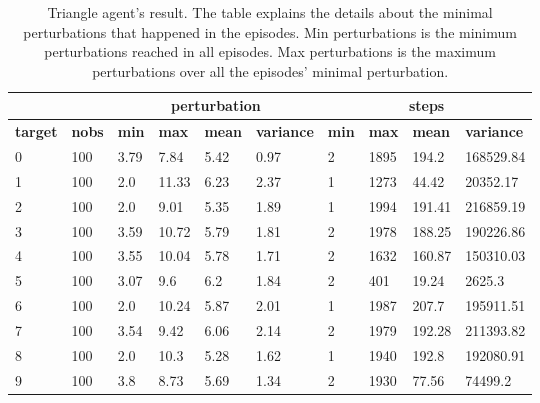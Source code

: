 \documentclass{article}
\begin{document}
\begin{table}[h]
\caption{Triangle agent's result. The table explains the details about the minimal perturbations that happened in the episodes. Min perturbations is the minimum perturbations reached in all episodes. Max perturbations is the maximum perturbations over all the episodes' minimal perturbation.}
\label{tab:simple_result}
\begin{tabular}{|l|l|l|l|l|l|l|l|l|l|}
\hline
\textbf{}       & \textbf{}     & \multicolumn{4}{c|}{\textbf{perturbation}}                      & \multicolumn{4}{c|}{\textbf{steps}}                             \\ \hline
\textbf{target} & \textbf{nobs} & \textbf{min} & \textbf{max} & \textbf{mean} & \textbf{variance} & \textbf{min} & \textbf{max} & \textbf{mean} & \textbf{variance} \\ \hline
0 & 100  & 3.79     & 7.84     & 5.42      & 0.97          & 2         & 1895      & 194.2      & 168529.84      \\ \hline
1 & 100  & 2.0      & 11.33    & 6.23      & 2.37          & 1         & 1273      & 44.42      & 20352.17       \\ \hline
2 & 100  & 2.0      & 9.01     & 5.35      & 1.89          & 1         & 1994      & 191.41     & 216859.19      \\ \hline
3 & 100  & 3.59     & 10.72    & 5.79      & 1.81          & 2         & 1978      & 188.25     & 190226.86      \\ \hline
4 & 100  & 3.55     & 10.04    & 5.78      & 1.71          & 2         & 1632      & 160.87     & 150310.03      \\ \hline
5 & 100  & 3.07     & 9.6      & 6.2       & 1.84          & 2         & 401       & 19.24      & 2625.3         \\ \hline
6 & 100  & 2.0      & 10.24    & 5.87      & 2.01          & 1         & 1987      & 207.7      & 195911.51      \\ \hline
7 & 100  & 3.54     & 9.42     & 6.06      & 2.14          & 2         & 1979      & 192.28     & 211393.82      \\ \hline
8 & 100  & 2.0      & 10.3     & 5.28      & 1.62          & 1         & 1940      & 192.8      & 192080.91      \\ \hline
9 & 100  & 3.8      & 8.73     & 5.69      & 1.34          & 2         & 1930      & 77.56      & 74499.2        \\ \hline
\end{tabular}
\end{table}
\end{document}
